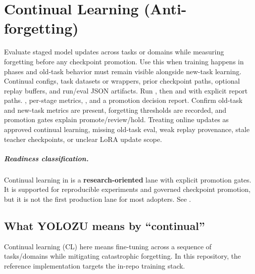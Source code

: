 \chapter{Continual Learning (Anti-forgetting)}
\label{chap:continual-learning}


\WorkflowOpening
{Evaluate staged model updates across tasks or domains while measuring forgetting before any checkpoint promotion.}
{Use this when training happens in phases and old-task behavior must remain visible alongside new-task learning.}
{Continual configs, task datasets or wrappers, prior checkpoint paths, optional replay buffers, and run/eval JSON artifacts.}
{Run , then  and  with explicit report paths.}
{, per-stage metrics, , and a promotion decision report.}
{Confirm old-task and new-task metrics are present, forgetting thresholds are recorded, and promotion gates explain promote/review/hold.}
{Treating online updates as approved continual learning, missing old-task eval, weak replay provenance, stale teacher checkpoints, or unclear LoRA update scope.}

\paragraph{Readiness classification.}
Continual learning in \yolozu{} is a \textbf{research-oriented} lane with explicit promotion gates.
It is supported for reproducible experiments and governed checkpoint promotion, but it is not the first production lane for most adopters.
See .


\section{What YOLOZU means by ``continual''}
Continual learning (CL) here means fine-tuning across a sequence of tasks/domains while mitigating catastrophic forgetting.
In this repository, the reference implementation targets the in-repo  training stack.

